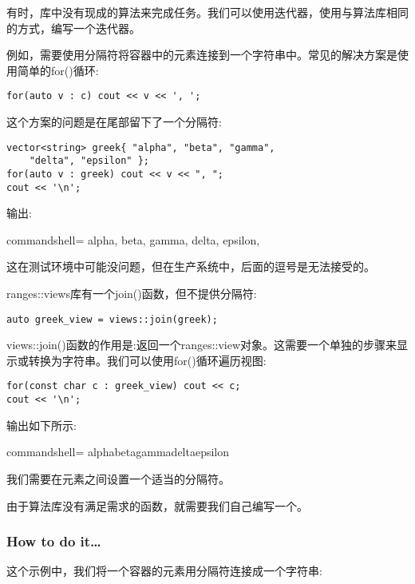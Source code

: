 
有时，库中没有现成的算法来完成任务。我们可以使用迭代器，使用与算法库相同的方式，编写一个迭代器。

例如，需要使用分隔符将容器中的元素连接到一个字符串中。常见的解决方案是使用简单的for()循环:

\begin{lstlisting}[style=styleCXX]
for(auto v : c) cout << v << ', ';
\end{lstlisting}

这个方案的问题是在尾部留下了一个分隔符:

\begin{lstlisting}[style=styleCXX]
vector<string> greek{ "alpha", "beta", "gamma",
	"delta", "epsilon" };
for(auto v : greek) cout << v << ", ";
cout << '\n';
\end{lstlisting}

输出:

\begin{tcblisting}{commandshell={}}
alpha, beta, gamma, delta, epsilon,
\end{tcblisting}

这在测试环境中可能没问题，但在生产系统中，后面的逗号是无法接受的。

ranges::views库有一个join()函数，但不提供分隔符:

\begin{lstlisting}[style=styleCXX]
auto greek_view = views::join(greek);
\end{lstlisting}

views::join()函数的作用是:返回一个ranges::view对象。这需要一个单独的步骤来显示或转换为字符串。我们可以使用for()循环遍历视图:

\begin{lstlisting}[style=styleCXX]
for(const char c : greek_view) cout << c;
cout << '\n';
\end{lstlisting}

输出如下所示:

\begin{tcblisting}{commandshell={}}
alphabetagammadeltaepsilon
\end{tcblisting}

我们需要在元素之间设置一个适当的分隔符。

由于算法库没有满足需求的函数，就需要我们自己编写一个。

\subsubsection{How to do it…}

这个示例中，我们将一个容器的元素用分隔符连接成一个字符串:

